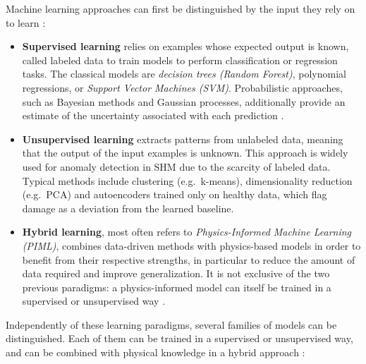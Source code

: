 \documentclass[12pt]{article}
\begin{document}
Machine learning approaches can first be distinguished by the input they rely on to learn :
 
\begin{itemize}[itemsep=8pt]
    
    \item \textbf{Supervised learning} relies on examples whose expected output is known, called labeled data to train models to perform classification or regression tasks. The classical models are \textit{decision trees (Random Forest)}, polynomial regressions, or \textit{Support Vector Machines (SVM)}. Probabilistic approaches, such as Bayesian methods and Gaussian processes, additionally provide an estimate of the uncertainty associated with each prediction \cite{s25196136}. 
    
    \item \textbf{Unsupervised learning} extracts patterns from unlabeled data, meaning that the output of the input examples is unknown. This approach is widely used for anomaly detection in SHM \cite{SAWANT2023106931, SPENCER2025100203, infrastructures11070228} due to the scarcity of labeled data. Typical methods include clustering (e.g.\ k-means), dimensionality reduction (e.g.\ PCA) and autoencoders trained only on healthy data, which flag damage as a deviation from the learned baseline. 

    \item \textbf{Hybrid learning}, most often refers to \textit{Physics-Informed Machine Learning (PIML)}, combines data-driven methods with physics-based models in order to benefit from their respective strengths, in particular to reduce the amount of data required and improve generalization. It is not exclusive of the two previous paradigms: a physics-informed model can itself be trained in a supervised or unsupervised way \cite{s25196136, infrastructures11070228}.
    
\end{itemize}

Independently of these learning paradigms, several families of models can be distinguished. Each of them can be trained in a supervised or unsupervised way, and can be combined with physical knowledge in a hybrid approach :
\end{document}
